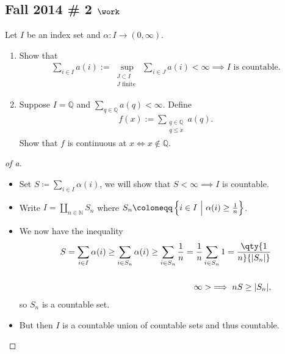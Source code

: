 \hypertarget{fall-2014-2-work}{%
\subsection{\texorpdfstring{Fall 2014 \# 2
\(\work\)}{Fall 2014 \# 2 \textbackslash work}}\label{fall-2014-2-work}}

Let \(I\) be an index set and \(\alpha: I \to (0, \infty)\).

\begin{enumerate}
\def\labelenumi{\alph{enumi}.}
\item
  Show that
  \begin{align*}
  \sum_{i \in I} a(i):=\sup _{\substack{ J \subset I \\ J \text { finite }}} \sum_{i \in J} a(i)<\infty \implies I \text{ is countable.}
  \end{align*}
\item
  Suppose \(I = {\mathbb{Q}}\) and
  \(\sum_{q \in \mathbb{Q}} a(q)<\infty\). Define
  \begin{align*}
  f(x):=\sum_{\substack{q \in \mathbb{Q}\\ q \leq x}} a(q).
  \end{align*}
  Show that \(f\) is continuous at \(x \iff x\not\in {\mathbb{Q}}\).
\end{enumerate}


\begin{solution}

\begin{proof}[of a]

\envlist

\begin{itemize}
\item
  Set \(S \coloneqq\sum_{i\in I} \alpha(i)\), we will show that
  \(S<\infty \implies I\) is countable.
\item
  Write \(I = {\coprod}_{n\in {\mathbb{N}}} S_n\) where
  \(S_n \coloneqq\left\{{i\in I {~\mathrel{\Big|}~}\alpha(i) \geq {1\over n}}\right\}\).
\item
  We now have the inequality
  \begin{align*}  
  S = \sum_{i\in I} \alpha(i) 
  \geq \sum_{i\in S_n} \alpha(i) 
  \geq \sum_{i\in S_n} {1\over n} 
  = {1\over n} \sum_{i\in S_n} 1 = \qty{1\over n} {\left\lvert {S_n} \right\rvert} \\ \\
  \infty > \implies n S \geq {\left\lvert {S_n} \right\rvert}
  ,\end{align*}
  so \(S_n\) is a countable set.
\item
  But then \(I\) is a countable union of countable sets and thus
  countable.
\end{itemize}

\end{proof}


\end{solution}

